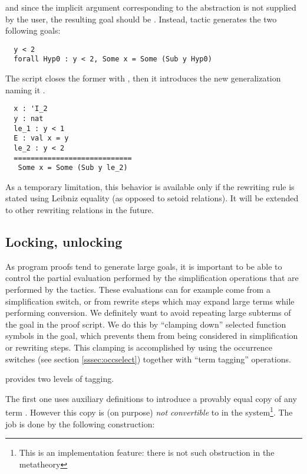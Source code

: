 and since the implicit argument corresponding to the  abstraction is not
supplied by the user, the resulting goal should be . Instead, \ssr{}  tactic generates the two following
goals:
\begin{lstlisting}
  y < 2
  forall Hyp0 : y < 2, Some x = Some (Sub y Hyp0)
\end{lstlisting}
The script closes the former with , then it introduces
the new generalization naming it .

\begin{lstlisting}
  x : 'I_2
  y : nat
  le_1 : y < 1
  E : val x = y
  le_2 : y < 2
  ============================
   Some x = Some (Sub y le_2)
\end{lstlisting}

As a temporary limitation, this behavior is available only if the rewriting
rule is stated using Leibniz equality (as opposed to setoid relations).
It will be extended to other rewriting relations in the future.

\subsection{Locking, unlocking }\label{ssec:lock}

As program proofs tend to generate large goals, it is important to be
able to control the partial evaluation performed by the simplification
operations that are performed by the tactics. These evaluations can
for example come from a \C{/=} simplification switch, or from rewrite steps
which may expand large terms while performing conversion. We definitely
want to avoid repeating large subterms of the goal in
the proof script. We do this by
``clamping down'' selected function symbols in the goal, which
prevents them from
being considered in simplification or rewriting steps. This clamping
is accomplished by using the occurrence switches (see section
\ref{sssec:occselect}) together with ``term tagging'' operations.

\ssr{} provides two levels of tagging.

The first one uses auxiliary definitions to introduce a provably equal
copy of any term . However this copy is (on purpose)
\emph{not convertible} to  in the \Coq{} system\footnote{This is
  an implementation feature: there is not such obstruction in the
  metatheory}. The job is done by the following construction:

